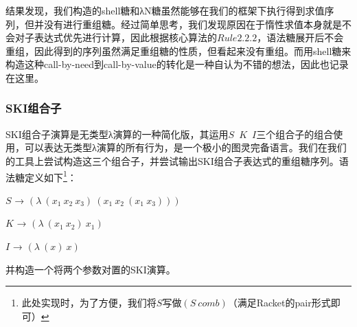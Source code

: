 结果发现，我们构造的shell糖和λN糖虽然能够在我们的框架下执行得到求值序列，但并没有进行重组糖。经过简单思考，我们发现原因在于惰性求值本身就是不会对子表达式优先进行计算，因此根据核心算法的$Rule2.2.2$，语法糖展开后不会重组，因此得到的序列虽然满足重组糖的性质，但看起来没有重组。而用shell糖来构造这种call-by-need到call-by-value的转化是一种自认为不错的想法，因此也记录在这里。

\subsubsection{SKI组合子}

SKI组合子演算是无类型λ演算的一种简化版，其运用$S$~$K$~$I$三个组合子的组合使用，可以表达无类型λ演算的所有行为，是一个极小的图灵完备语言。我们在我们的工具上尝试构造这三个组合子，并尝试输出SKI组合子表达式的重组糖序列。语法糖定义如下\footnote{此处实现时，为了方便，我们将$S$写做$(S~comb)$（满足Racket的pair形式即可）}：

\begin{flushleft}
	$S$ → $(\lambda~(x_{1}~x_{2}~x_{3})~(x_{1}~x_{2}~(x_{1}~x_{3})))$
	
	$K$ → $(\lambda~(x_{1}~x_{2})~x_{1})$
	
	$I$ → $(\lambda~(x)~x)$
\end{flushleft}

并构造一个将两个参数对置的SKI演算。


